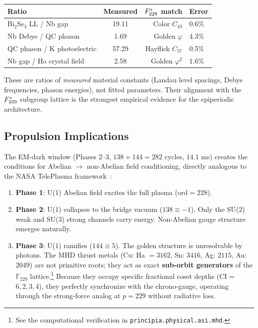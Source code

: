 \begin{center}
{\small
\begin{tabular}{@{}lcrl@{}}
\toprule
\textbf{Ratio} & \textbf{Measured} & \textbf{$F_{229}^*$ match} & \textbf{Error} \\
\midrule
Bi$_2$Se$_3$ LL / Nb gap         & 19.11 & Color $C_{19}$      & 0.6\% \\
Nb Debye / QC phason              & 1.69  & Golden $\varphi$     & 4.3\% \\
QC phason / K photoelectric        & 57.29 & Hayflick $C_{57}$   & 0.5\% \\
Nb gap / Ho crystal field          & 2.58  & Golden $\varphi^2$  & 1.6\% \\
\bottomrule
\end{tabular}
}
\end{center}

\noindent These are ratios of \emph{measured} material constants (Landau level spacings, Debye frequencies, phason energies), not fitted parameters. Their alignment with the $F_{229}^*$ subgroup lattice is the strongest empirical evidence for the epiperiodic architecture.

\subsection{Propulsion Implications}\label{sec:propulsion}

The EM-dark window (Phases 2--3, $138 + 144 = 282$ cycles, $14.1$ ms) creates the conditions for Abelian $\to$ non-Abelian field conditioning, directly analogous to the NASA TelePlasma framework~\cite{TelePlasma2000}:

\begin{enumerate}
    \item \textbf{Phase 1}: U(1) Abelian field excites the full plasma ($\mathrm{ord} = 228$).
    \item \textbf{Phase 2}: U(1) collapses to the bridge vacuum ($138 \equiv -1$). Only the SU(2) weak and SU(3) strong channels carry energy. Non-Abelian gauge structure emerges naturally.
    \item \textbf{Phase 3}: U(1) ramifies ($144 \equiv 5$). The golden structure is unresolvable by photons. The MHD thrust metals (Cu: Ha $= 3162$, Sn: $3416$, Ag: $2115$, Au: $2049$) are not primitive roots; they act as exact \textbf{sub-orbit generators} of the $\mathbb{F}_{229}$ lattice.\footnote{See the computational verification in \texttt{principia.physical.asi.mhd}.} Because they occupy specific fractional coset depths (CI = $6, 2, 3, 4$), they perfectly synchronize with the chrono-gauge, operating through the strong-force analog at $p = 229$ without radiative loss.
\end{enumerate}

